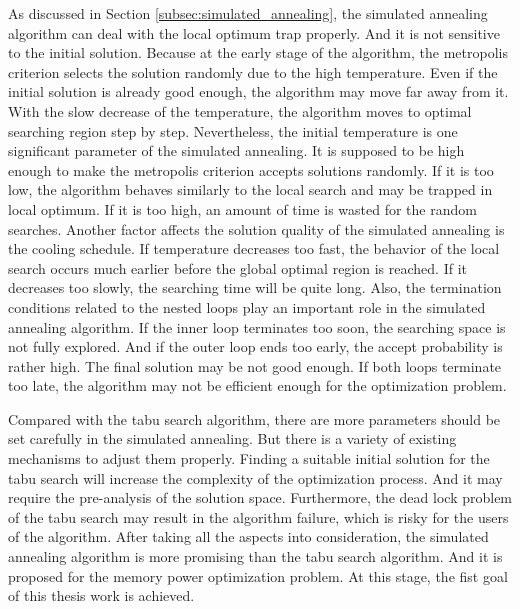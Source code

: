 	As discussed in Section \ref{subsec:simulated_annealing}, the simulated
	annealing algorithm can deal with the local optimum trap properly.
	And it is not sensitive to the initial solution. Because at the early
	stage of the algorithm, the metropolis criterion selects the solution
	randomly due to the high temperature. Even if the initial solution is
	already good enough, the algorithm may move far away from it. With the
	slow decrease of the temperature, the algorithm moves to optimal searching
	region step by step.
	Nevertheless, the initial temperature is one significant parameter of the
	simulated annealing. It is supposed to be high enough to make the metropolis
	criterion accepts solutions randomly. If it is too low, the algorithm
	behaves similarly to the local search and may be trapped in local optimum.
	If it is too high, an amount of time is wasted for the random searches.
	Another factor affects the solution quality of the simulated annealing is the
	cooling schedule. If temperature decreases too fast, the behavior of the local
	search occurs much earlier before the global optimal region is reached.
	If it decreases too slowly, the searching time will be quite long.
	Also, the termination conditions related to the nested loops play an important
	role in the simulated annealing algorithm. If the inner loop terminates too
	soon, the searching space is not fully explored. And if the outer loop ends too
	early, the accept probability is rather high. The final solution may be not
	good enough. If both loops terminate too late, the algorithm may not be efficient
	enough for the optimization problem.
	
	Compared with the tabu search algorithm, there are more parameters should be set
	carefully in the simulated annealing. But there is a variety of existing mechanisms
	to adjust them properly. Finding a suitable initial solution for the tabu search
	will increase the complexity of the optimization process.
	And it may require the pre-analysis of the solution space. Furthermore, the
	dead lock problem of the tabu search may result in the algorithm failure,
	which is risky for the users of the algorithm. After taking all the
	aspects into consideration, the simulated annealing algorithm is more
	promising than the tabu search algorithm. And it is proposed for the memory
	power optimization problem. At this stage, the fist goal of this thesis work
	is achieved.